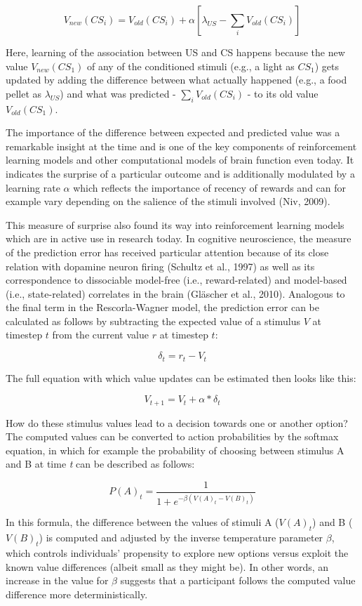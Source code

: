 \documentclass[12pt,openany]{book}
\theoremstyle{definition}
\theoremstyle{definition}
\theoremstyle{definition}
\theoremstyle{remark}
\begin{document}
\[V_{new}(CS_i) = V_{old}(CS_i) + \alpha\left[\lambda_{US} - \sum_iV_{old}(CS_i)\right]\]

Here, learning of the association between US and CS happens because the
new value \(V_{new}(CS_1)\) of any of the conditioned stimuli (e.g., a
light as \(CS_1\)) gets updated by adding the difference between what
actually happened (e.g., a food pellet as \(\lambda_{US}\)) and what was
predicted - \(\sum_iV_{old}(CS_i)\) - to its old value
\(V_{old}(CS_1)\).

The importance of the difference between expected and predicted value
was a remarkable insight at the time and is one of the key components of
reinforcement learning models and other computational models of brain
function even today. It indicates the surprise of a particular outcome
and is additionally modulated by a learning rate \(\alpha\) which
reflects the importance of recency of rewards and can for example vary
depending on the salience of the stimuli involved (Niv, 2009).

This measure of surprise also found its way into reinforcement learning
models which are in active use in research today. In cognitive
neuroscience, the measure of the prediction error has received
particular attention because of its close relation with dopamine neuron
firing (Schultz et al., 1997) as well as its correspondence to
dissociable model-free (i.e., reward-related) and model-based (i.e.,
state-related) correlates in the brain (Gläscher et al., 2010).
Analogous to the final term in the Rescorla-Wagner model, the prediction
error can be calculated as follows by subtracting the expected value of
a stimulus \(V\) at timestep \(t\) from the current value \(r\) at
timestep \(t\):

\[\delta_t = r_t - V_t\]

The full equation with which value updates can be estimated then looks
like this:

\[V_{t+1} = V_t + \alpha * \delta_t\]

How do these stimulus values lead to a decision towards one or another
option? The computed values can be converted to action probabilities by
the softmax equation, in which for example the probability of choosing
between stimulus A and B at time \emph{t} can be described as follows:

\[P(A)_t = \frac{1}{1 + e^{-\beta(V(A)_t - V(B)_t)}}\]

In this formula, the difference between the values of stimuli A
(\(V(A)_t\)) and B (\(V(B)_t\)) is computed and adjusted by the inverse
temperature parameter \(\beta\), which controls individuals' propensity
to explore new options versus exploit the known value differences
(albeit small as they might be). In other words, an increase in the
value for \(\beta\) suggests that a participant follows the computed
value difference more deterministically.
\end{document}
